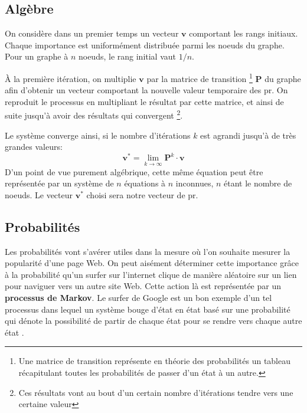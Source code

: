 \documentclass[12pt,twoside, openright]{memoir}
\begin{document}
	\subsection{Algèbre}
	On considère dans un premier temps un vecteur $\textbf{v}$ comportant les rangs initiaux. Chaque importance est uniformément distribuée parmi les noeuds du graphe. Pour un graphe à $n$ noeuds, le rang initial vaut $1/n$.\par
	À la première itération, on multiplie $\textbf{v}$ par la matrice de transition \footnote{Une matrice de transition représente en théorie des probabilités un tableau récapitulant toutes les probabilités de passer d'un état à un autre.} $\textbf{P}$ du graphe afin d'obtenir un vecteur comportant la nouvelle valeur temporaire des \gls{pr}. On reproduit le processus en multipliant le résultat par cette matrice, et ainsi de suite jusqu'à avoir des résultats qui convergent \footnote{Ces résultats vont au bout d'un certain nombre d'itérations tendre vers une certaine valeur}.\par
	Le système converge ainsi, si le nombre d'itérations $k$ est agrandi jusqu'à de très grandes valeurs: 
	$$\textbf{v}^*=\lim\limits_{k\to\infty}\textbf{P}^k\cdot\textbf{v}$$
	D'un point de vue purement algébrique, cette même équation peut être représentée par un système de $n$ équations à $n$ inconnues, $n$ étant le nombre de noeuds. Le vecteur $\textbf{v}^*$ choisi sera notre vecteur de \gls{pr}.
	\subsection{Probabilités}
	Les probabilités vont s'avérer utiles dans la mesure où l'on souhaite mesurer la popularité d'une page Web. On peut aisément déterminer cette importance grâce à la probabilité qu'un surfer sur l'internet clique de manière aléatoire sur un lien pour naviguer vers un autre site Web. Cette action là est représentée par un \textbf{processus de Markov}. Le surfer de Google est un bon exemple d'un tel processus dans lequel un système bouge d'état en état basé sur une probabilité qui dénote la possibilité de partir de chaque état pour se rendre vers chaque autre état \cite{ref_randompr}.
\end{document}
